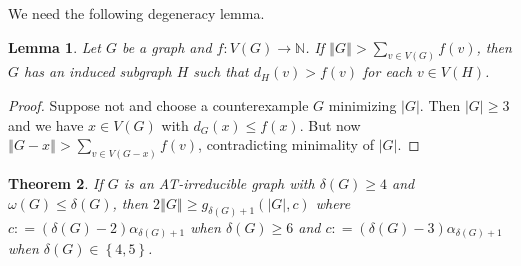 \documentclass[12pt]{article}
\theoremstyle{plain}
\newtheorem{thm}{Theorem}[section]
\newtheorem{lem}[thm]{Lemma}
\theoremstyle{definition}
\theoremstyle{remark}
\newcommand{\IN}{\mathbb{N}}
\newcommand{\set}[1]{\left\{ #1 \right\}}
\newcommand{\card}[1]{\left|#1\right|}
\newcommand{\size}[1]{\left\Vert#1\right\Vert}
\newcommand{\func}[3]{#1\colon #2 \rightarrow #3}
\newcommand{\DefinedAs}{\mathrel{\mathop:}=}
\begin{document}
\noindent We need the following degeneracy lemma.
\begin{lem}\label{DegenerateEuler}
Let $G$ be a graph and $\func{f}{V(G)}{\IN}$.  If $\size{G} > \sum_{v \in V(G)} f(v)$, then $G$ has an induced subgraph $H$ such that $d_H(v) > f(v)$ for each $v \in V(H)$.
\end{lem}
\begin{proof}
Suppose not and choose a counterexample $G$ minimizing $\card{G}$. Then $\card{G} \ge 3$ and we have $x \in V(G)$ with $d_G(x) \leq f(x)$. But now $\size{G-x} > \sum_{v \in V(G-x)} f(v)$, contradicting minimality of $\card{G}$.
\end{proof}

\begin{thm}\label{EdgeBoundEuler}
	If $G$ is an AT-irreducible graph with $\delta(G) \ge 4$ and $\omega(G) \le \delta(G)$, then $2\size{G} \ge g_{\delta(G)+1}(\card{G}, c)$ where $c \DefinedAs (\delta(G)-2)\alpha_{\delta(G) + 1}$ when $\delta(G) \ge 6$ and $c \DefinedAs (\delta(G)-3)\alpha_{\delta(G) + 1}$ when $\delta(G) \in \set{4,5}$.
\end{thm}
\end{document}
